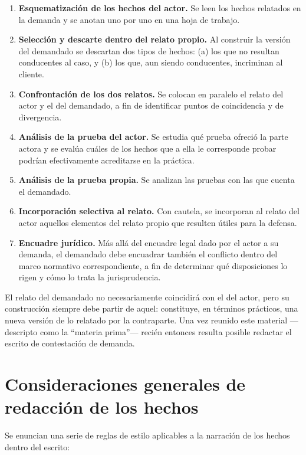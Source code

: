 \documentclass[12pt,oneside]{book}
\begin{document}
\begin{enumerate}
    \item \textbf{Esquematización de los hechos del actor.} Se leen los hechos relatados en la demanda y se anotan uno por uno en una hoja de trabajo.
    \item \textbf{Selección y descarte dentro del relato propio.} Al construir la versión del demandado se descartan dos tipos de hechos: (a) los que no resultan conducentes al caso, y (b) los que, aun siendo conducentes, incriminan al cliente.
    \item \textbf{Confrontación de los dos relatos.} Se colocan en paralelo el relato del actor y el del demandado, a fin de identificar puntos de coincidencia y de divergencia.
    \item \textbf{Análisis de la prueba del actor.} Se estudia qué prueba ofreció la parte actora y se evalúa cuáles de los hechos que a ella le corresponde probar podrían efectivamente acreditarse en la práctica.
    \item \textbf{Análisis de la prueba propia.} Se analizan las pruebas con las que cuenta el demandado.
    \item \textbf{Incorporación selectiva al relato.} Con cautela, se incorporan al relato del actor aquellos elementos del relato propio que resulten útiles para la defensa.
    \item \textbf{Encuadre jurídico.} Más allá del encuadre legal dado por el actor a su demanda, el demandado debe encuadrar también el conflicto dentro del marco normativo correspondiente, a fin de determinar qué disposiciones lo rigen y cómo lo trata la jurisprudencia.
\end{enumerate}

\begin{note}
El relato del demandado no necesariamente coincidirá con el del actor, pero su construcción siempre debe partir de aquel: constituye, en términos prácticos, una nueva versión de lo relatado por la contraparte. Una vez reunido este material —descripto como la ``materia prima''— recién entonces resulta posible redactar el escrito de contestación de demanda.
\end{note}

\section{Consideraciones generales de redacción de los hechos}

Se enuncian una serie de reglas de estilo aplicables a la narración de los hechos dentro del escrito:
\end{document}
